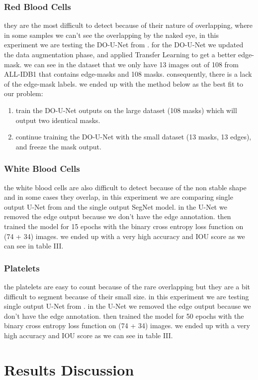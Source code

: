 \documentclass[conference]{IEEEtran}
\begin{document}
\subsubsection{Red Blood Cells}
they are the most difficult to detect because of their nature of overlapping, where in some samples we can’t see the overlapping by the naked eye, in this experiment we are testing the DO-U-Net from \cite{12}. for the DO-U-Net we updated the data augmentation phase, and applied Transfer Learning to get a better edge-mask. we can see in the dataset that we only have 13 images out of 108 from ALL-IDB1 that contains edge-masks and 108 masks. consequently, there is a lack of the edge-mask labels. we ended up with the method below as the best fit to our problem: 
\begin{enumerate}
\item train the DO-U-Net outputs on the large dataset (108 masks) which will output two identical masks.
\item continue training the DO-U-Net with the small dataset (13 masks, 13 edges), and freeze the mask output.
\end{enumerate}
\subsubsection{White Blood Cells}
the white blood cells are also difficult to detect because of the non stable shape and in some cases they overlap, in this experiment we are comparing single output U-Net from \cite{12} and the single output SegNet model. in the U-Net we removed the edge output because we don’t have the edge annotation. then trained the model for 15 epochs with the binary cross entropy loss function on (74 + 34) images. we ended up with a very high accuracy and IOU score as we can see in table III.
\subsubsection{Platelets}
the platelets are easy to count because of the rare overlapping but they are a bit difficult to segment because of their small size. in this experiment we are testing single output U-Net from \cite{12}. in the U-Net we removed the edge output because we don’t have the edge annotation. then trained the model for 50 epochs with the binary cross entropy loss function on (74 + 34) images. we ended up with a very high accuracy and IOU score as we can see in table III.
\section{Results Discussion}
\end{document}
